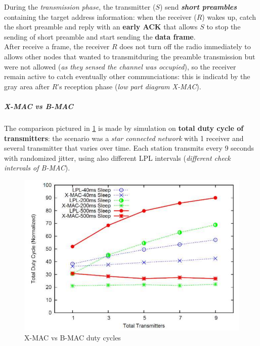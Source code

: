 \documentclass[10pt,a4paper]{report}
\theoremstyle{definition}
\begin{document}
During the \textit{transmission phase}, the transmitter ($S$) send \textit{\textbf{short preambles}} containing the target address information: when the receiver ($R$) wakes up, catch the short preamble and reply with an \textbf{early ACK} that allows $S$ to stop the sending of short preamble and start sending the \textbf{data frame}.\\
After receive a frame, the receiver $R$ does not turn off the radio immediately to allows other nodes that wanted to transmitduring the preamble transmission but were not allowed (\textit{as they sensed the channel was occupied}), so the receiver remain active to catch eventually other communciations: this is indicatd by the gray area after $R$'s reception phase  (\textit{low part diagram X-MAC}).
\subparagraph{X-MAC vs B-MAC}\label{sec:x-mac-vs-b-mac}
The comparison pictured in \ref{xmac-bmac} is made by simulation on \textbf{total duty cycle of transmitters}: the scenario was a \textit{star connected network} with 1 receiver and several transmitter that varies over time. Each station transmits every 9 seconds with randomized jitter, using also different LPL intervals (\textit{different check intervals of B-MAC}).
\begin{figure}[h!]
	\centering\includegraphics[scale=0.30]{images/Pasted image 20230409090844.png}
	\caption{X-MAC vs B-MAC duty cycles}
\label{xmac-bmac}
\end{figure}
\end{document}
